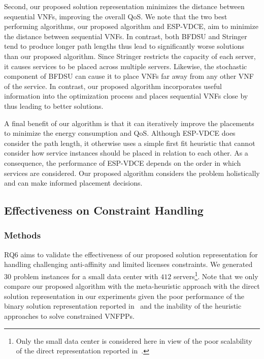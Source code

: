 Second, our proposed solution representation minimizes the distance between sequential VNFs, improving the overall QoS. We note that the two best performing algorithms, our proposed algorithm and ESP-VDCE, aim to minimize the distance between sequential VNFs. In contrast, both BFDSU and Stringer tend to produce longer path lengths thus lead to significantly worse solutions than our proposed algorithm. Since Stringer restricts the capacity of each server, it causes services to be placed across multiple servers. Likewise, the stochastic component of BFDSU can cause it to place VNFs far away from any other VNF of the service. In contrast, our proposed algorithm incorporates useful information into the optimization process and places sequential VNFs close by thus leading to better solutions.

A final benefit of our algorithm is that it can iteratively improve the placements to minimize the energy consumption and QoS. Although ESP-VDCE does consider the path length, it otherwise uses a simple first fit heuristic that cannot consider how service instances should be placed in relation to each other. As a consequence, the performance of ESP-VDCE depends on the order in which services are considered. Our proposed algorithm considers the problem holistically and can make informed placement decisions.

\vspace{1em}
\noindent
{}

\subsection{Effectiveness on Constraint Handling}
\label{sec:custom_operators}

\subsubsection{Methods}

RQ6 aims to validate the effectiveness of our proposed solution representation for handling challenging anti-affinity and limited licenses constraints. We generated $30$ problem instances for a small data center with $412$ servers\footnote{Only the small data center is considered here in view of the poor scalability of the direct representation reported in~.}. Note that we only compare our proposed algorithm with the meta-heuristic approach with the direct solution representation in our experiments given the poor performance of the binary solution representation reported in~ and the inability of the heuristic approaches to solve constrained VNFPPs.

